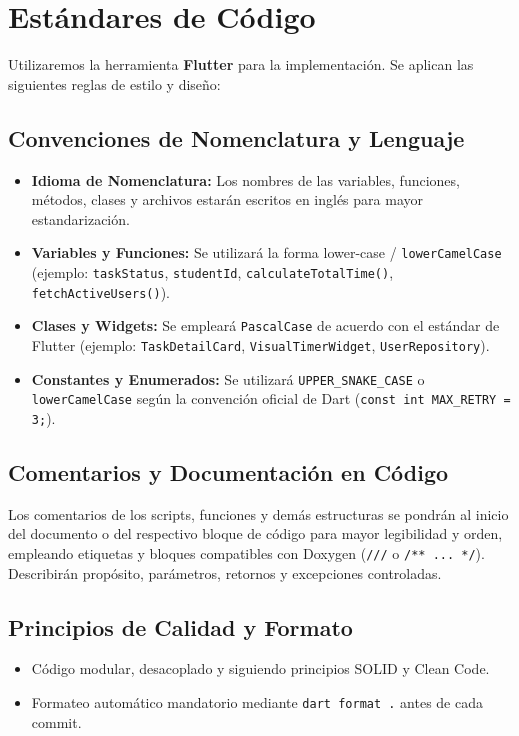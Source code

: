 \newpage
\section{Estándares de Código}

Utilizaremos la herramienta \textbf{Flutter} para la implementación. Se aplican las siguientes reglas de estilo y diseño:

\subsection{Convenciones de Nomenclatura y Lenguaje}
\begin{itemize}[leftmargin=*]
  \item \textbf{Idioma de Nomenclatura:} Los nombres de las variables, funciones, métodos, clases y archivos estarán escritos en inglés para mayor estandarización.
  \item \textbf{Variables y Funciones:} Se utilizará la forma lower-case / \texttt{lowerCamelCase} (ejemplo: \texttt{taskStatus}, \texttt{studentId}, \texttt{calculateTotalTime()}, \texttt{fetchActiveUsers()}).
  \item \textbf{Clases y Widgets:} Se empleará \texttt{PascalCase} de acuerdo con el estándar de Flutter (ejemplo: \texttt{TaskDetailCard}, \texttt{VisualTimerWidget}, \texttt{UserRepository}).
  \item \textbf{Constantes y Enumerados:} Se utilizará \texttt{UPPER\_SNAKE\_CASE} o \texttt{lowerCamelCase} según la convención oficial de Dart (\texttt{const int MAX\_RETRY = 3;}).
\end{itemize}

\subsection{Comentarios y Documentación en Código}
Los comentarios de los scripts, funciones y demás estructuras se pondrán al inicio del documento o del respectivo bloque de código para mayor legibilidad y orden, empleando etiquetas y bloques compatibles con Doxygen (\texttt{///} o \texttt{/** ... */}). Describirán propósito, parámetros, retornos y excepciones controladas.

\subsection{Principios de Calidad y Formato}
\begin{itemize}[leftmargin=*]
  \item Código modular, desacoplado y siguiendo principios SOLID y Clean Code.
  \item Formateo automático mandatorio mediante \texttt{dart format .} antes de cada commit.
\end{itemize}
